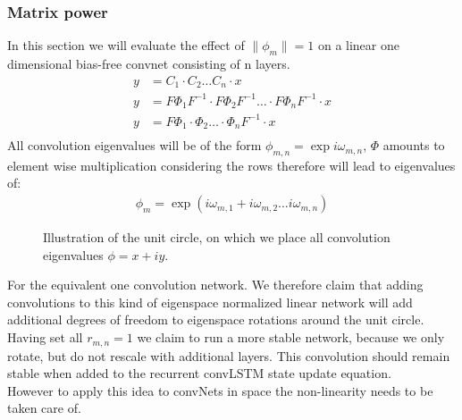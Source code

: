 \documentclass{article}
\begin{document}
\subsubsection{Matrix power}   
\label{seq:linstab}
In this section we will evaluate the effect of $\| \phi_m \| = 1$ on a linear one dimensional bias-free convnet consisting of n layers.
\begin{align}
y &= C_1 \cdot C_2 \dots C_n \cdot x \\
y &= F \Phi_1 F^{-1} \cdot F\Phi_2 F^{-1} \dots \cdot F\Phi_n F^{-1} \cdot x \\
y &= F \Phi_1 \cdot \Phi_2 \dots \cdot \Phi_n F^{-1}\cdot x \\ 
\end{align}
All convolution eigenvalues will be of the form $\phi_{m,n} = \exp{i\omega_{m,n}}$, $\Phi$ amounts to element wise multiplication considering the rows therefore will lead to eigenvalues of:
\begin{align}
\phi_m = \exp(i\omega_{m,1} + i\omega_{m,2} \dots i\omega_{m,n} )
\end{align}
\begin{figure}
    \centering
    \caption{Illustration of the unit circle, on which we place all convolution
    eigenvalues $\phi = x + iy$.}
\end{figure}
For the equivalent one convolution network. We therefore claim that adding convolutions to this kind of eigenspace normalized linear network will add additional degrees of freedom to eigenspace rotations around the unit circle. Having set all $r_{m,n} = 1$ we claim to run a more stable network, because we only rotate, but do not rescale with additional layers.
This convolution should remain stable when added to the  recurrent convLSTM state update equation. \\
However to apply this idea to convNets in space the non-linearity needs to be taken care of.
\end{document}
